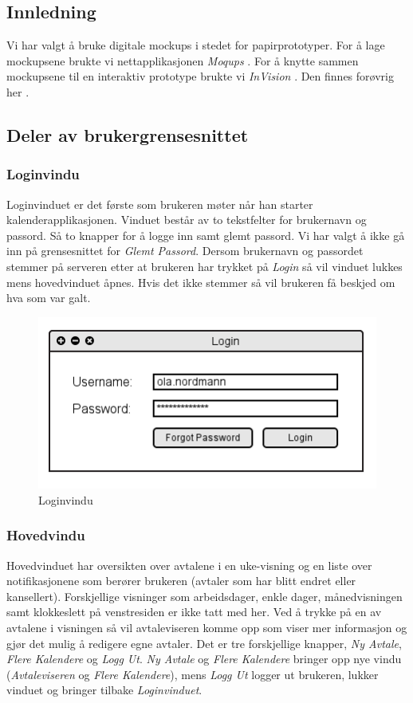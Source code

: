 \subsection{Innledning}
Vi har valgt å bruke digitale mockups i stedet for papirprototyper. For å lage mockupsene brukte vi nettapplikasjonen \emph{Moqups} \cite{moqups}. For å knytte sammen mockupsene til en interaktiv prototype brukte vi \emph{InVision} \cite{invision}. Den finnes forøvrig her \cite{invisio}. 

\subsection{Deler av brukergrensesnittet}
\subsubsection{Loginvindu}
Loginvinduet er det første som brukeren møter når han starter kalenderapplikasjonen. Vinduet består av to tekstfelter for brukernavn og passord. Så to knapper for å logge inn samt glemt passord. Vi har valgt å ikke gå inn på grensesnittet for \emph{Glemt Passord}. Dersom brukernavn og passordet stemmer på serveren etter at brukeren har trykket på \emph{Login} så vil vinduet lukkes mens hovedvinduet åpnes. Hvis det ikke stemmer så vil brukeren få beskjed om hva som var galt.

\begin{figure}[H]
\centering
\includegraphics[scale=0.65]{images/login.png}
\caption{Loginvindu}
\label{login_image}
\end{figure}

\subsubsection{Hovedvindu}
Hovedvinduet har oversikten over avtalene i en uke-visning og en liste over notifikasjonene som berører brukeren (avtaler som har blitt endret eller kansellert). Forskjellige visninger som arbeidsdager, enkle dager, månedvisningen samt klokkeslett på venstresiden er ikke tatt med her. Ved å trykke på en av avtalene i visningen så vil avtaleviseren komme opp som viser mer informasjon og gjør det mulig å redigere egne avtaler. Det er tre forskjellige knapper, \emph{Ny Avtale}, \emph{Flere Kalendere} og \emph{Logg Ut}. \emph{Ny Avtale} og \emph{Flere Kalendere} bringer opp nye vindu (\emph{Avtaleviseren} og \emph{Flere Kalendere}), mens \emph{Logg Ut} logger ut brukeren, lukker vinduet og bringer tilbake \emph{Loginvinduet}.

